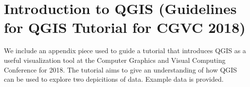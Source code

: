 \section{Introduction to QGIS (Guidelines for QGIS Tutorial for CGVC 2018)}
We include an appendix piece used to guide a tutorial that introduces QGIS as a useful visualization tool at the Computer Graphics and Visual Computing Conference for 2018. The tutorial aims to give an understanding of how QGIS can be used to explore two depicitions of data. Example data is provided.

 

%
%

%
